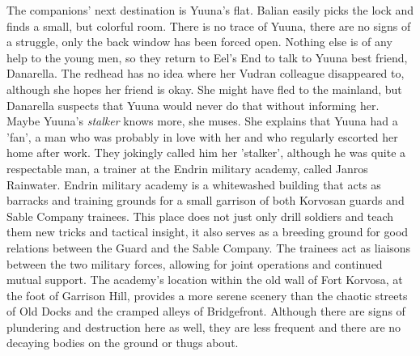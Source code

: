 The companions' next destination is Yuuna's flat. Balian easily picks the lock and finds a small, but colorful room. There is no trace of Yuuna, there are no signs of a struggle, only the back window has been forced open. Nothing else is of any help to the young men, so they return to Eel's End to talk to Yuuna best friend, Danarella. The redhead has no idea where her Vudran colleague disappeared to, although she hopes her friend is okay. She might have fled to the mainland, but Danarella suspects that Yuuna would never do that without informing her. Maybe Yuuna's {\itshape stalker} knows more, she muses. She explains that Yuuna had a 'fan', a man who was probably in love with her and who regularly escorted her home after work. They jokingly called him her 'stalker', although he was quite a respectable man, a trainer at the Endrin military academy, called Janros Rainwater. Endrin military academy is a whitewashed building that acts as barracks and training grounds for a small garrison of both Korvosan guards and Sable Company trainees. This place does not just only drill soldiers and teach them new tricks and tactical insight, it also serves as a breeding ground for good relations between the Guard and the Sable Company. The trainees act as liaisons between the two military forces, allowing for joint operations and continued mutual support. The academy's location within the old wall of Fort Korvosa, at the foot of Garrison Hill, provides a more serene scenery than the chaotic streets of Old Docks and the cramped alleys of Bridgefront. Although there are signs of plundering and destruction here as well, they are less frequent and there are no decaying bodies on the ground or thugs about.\\

